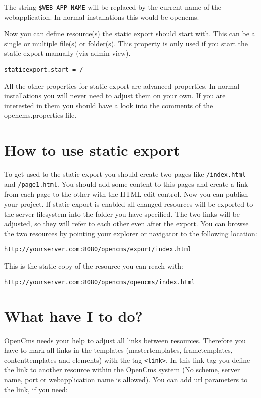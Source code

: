 The string \texttt{\${WEB\_APP\_NAME}} will be replaced by the current name of the webapplication. In normal installations this would be opencms.

Now you can define resource(s) the static export should start with. This can be a single or multiple file(s) or folder(s). This property is only used if you start the static export manually (via admin view).

\texttt{staticexport.start = /}

All the other properties for static export are advanced properties. In normal installations you will never need to adjust them on your own. If you are interested in them you should have a look into the comments of the opencms.properties file.

\section{How to use static export}

To get used to the static export you should create two pages like \texttt{/index.html} and \texttt{/page1.html}. You should add some content to this pages and create a link from each page to the other with the HTML edit control. Now you can publish your project. If static export is enabled all changed resources will be exported to the server filesystem into the folder you have specified. The two links will be adjusted, so they will refer to each other even after the export. You can browse the two resources by pointing your explorer or navigator to the following location:

\texttt{http://yourserver.com:8080/opencms/export/index.html}

This is the static copy of the resource you can reach with:

\texttt{http://yourserver.com:8080/opencms/opencms/index.html}

\section{What have I to do?}

OpenCms needs your help to adjust all links between resources. Therefore you have to mark all links in the templates (mastertemplates, frametemplates, contenttemplates and elements) with the tag \texttt{<link>}. In this link tag you define the link to another resource within the OpenCms system (No scheme, server name, port or webapplication name is allowed). You can add url parameters to the link, if you need:

